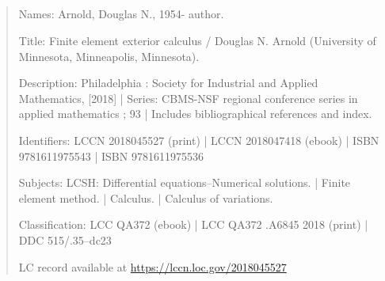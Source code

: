 \subsection*{}
\begin{quote}\small
Names: Arnold, Douglas N., 1954- author.\par
Title: Finite element exterior calculus / Douglas N. Arnold (University of Minnesota, Minneapolis, Minnesota).\par
Description: Philadelphia : Society for Industrial and Applied Mathematics, [2018] | Series: CBMS-NSF regional conference series in applied mathematics ; 93 | Includes bibliographical references and index.\par
Identifiers: LCCN 2018045527 (print) | LCCN 2018047418 (ebook) | ISBN 9781611975543 | ISBN 9781611975536\par
Subjects: LCSH: Differential equations--Numerical solutions. | Finite element method. | Calculus. | Calculus of variations.\par
Classification: LCC QA372 (ebook) | LCC QA372 .A6845 2018 (print) | DDC 515/.35--dc23\par
LC record available at \url{https://lccn.loc.gov/2018045527}
\end{quote}

\clearpage
